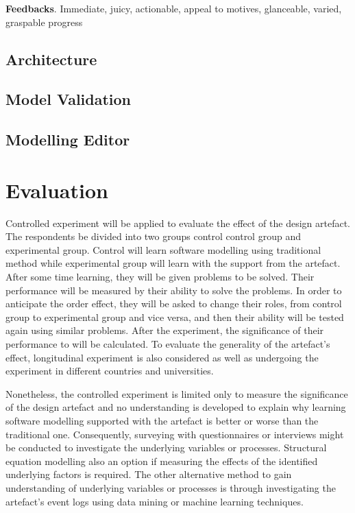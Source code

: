 \documentclass[runningheads,a4paper]{llncs}
\begin{document}
\textbf{Feedbacks}. Immediate, juicy, actionable, appeal to motives, glanceable, varied, graspable progress

\subsection{Architecture}

\subsection{Model Validation}

\subsection{Modelling Editor}

\section{Evaluation}
Controlled experiment will be applied to evaluate the effect of the design artefact. The respondents be divided into two groups control control group and experimental group. Control will learn software modelling using traditional method while experimental group will learn with the support from the artefact. After some time learning, they will be given problems to be solved. Their performance will be measured by their ability to solve the problems. In order to anticipate the order effect, they will be asked to change their roles, from control group to experimental group and vice versa, and then their ability will be tested again using similar problems. After the experiment, the significance of their performance to will be calculated. To evaluate the generality of the artefact's effect, longitudinal experiment is also considered  as well as undergoing the experiment in different countries and universities.

Nonetheless, the controlled experiment is limited only to measure the significance of the design artefact and no understanding is developed to explain why learning software modelling supported with the artefact is better or worse than the traditional one. Consequently, surveying with questionnaires or interviews might be conducted to investigate the underlying variables or processes. Structural equation modelling also an option if measuring the effects of the identified underlying factors is required. The other alternative method to gain understanding of underlying variables or processes is through investigating the artefact's event logs using data mining or machine learning techniques.
\end{document}
